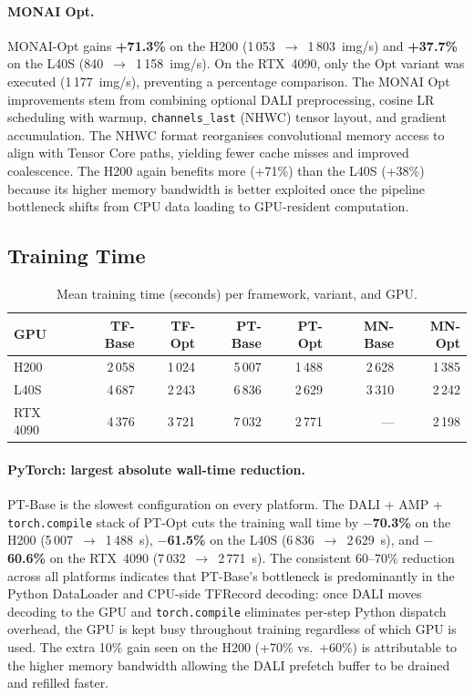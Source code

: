 \paragraph{MONAI Opt.}
MONAI-Opt gains \textbf{+71.3\%} on the H200 (1\,053~$\to$~1\,803~img/s)
and \textbf{+37.7\%} on the L40S (840~$\to$~1\,158~img/s).  On the
RTX~4090, only the Opt variant was executed (1\,177~img/s), preventing
a percentage comparison.  The MONAI Opt improvements stem from combining
optional DALI preprocessing, cosine LR scheduling with warmup,
\texttt{channels\_last} (NHWC) tensor layout, and gradient
accumulation.  The NHWC format reorganises convolutional memory access
to align with Tensor Core paths, yielding fewer cache misses and
improved coalescence.  The H200 again benefits more (+71\%) than the
L40S (+38\%) because its higher memory bandwidth is better exploited
once the pipeline bottleneck shifts from CPU data loading to
GPU-resident computation.

\subsection{Training Time}
\label{subsec:train_time}

\begin{table}[h]
  \centering
  \caption{Mean training time (seconds) per framework, variant, and GPU.}
  \label{tab:train_time_summary}
  \begin{tabular}{lrrrrrr}
    \hline
    \textbf{GPU} & \textbf{TF-Base} & \textbf{TF-Opt} & \textbf{PT-Base} & \textbf{PT-Opt} & \textbf{MN-Base} & \textbf{MN-Opt} \\
    \hline
    H200    & 2\,058 & 1\,024 & 5\,007 & 1\,488 & 2\,628 & 1\,385 \\
    L40S    & 4\,687 & 2\,243 & 6\,836 & 2\,629 & 3\,310 & 2\,242 \\
    RTX 4090 & 4\,376 & 3\,721 & 7\,032 & 2\,771 &   ---  & 2\,198 \\
    \hline
  \end{tabular}
\end{table}

\paragraph{PyTorch: largest absolute wall-time reduction.}
PT-Base is the slowest configuration on every platform.  The DALI +
AMP + \texttt{torch.compile} stack of PT-Opt cuts the training wall
time by \textbf{$-$70.3\%} on the H200 (5\,007~$\to$~1\,488~s),
\textbf{$-$61.5\%} on the L40S (6\,836~$\to$~2\,629~s), and
\textbf{$-$60.6\%} on the RTX~4090 (7\,032~$\to$~2\,771~s).  The
consistent 60--70\% reduction across all platforms indicates that
PT-Base's bottleneck is predominantly in the Python DataLoader and
CPU-side TFRecord decoding: once DALI moves decoding to the GPU and
\texttt{torch.compile} eliminates per-step Python dispatch overhead,
the GPU is kept busy throughout training regardless of which GPU is
used.  The extra 10\% gain seen on the H200 (+70\% vs.\ +60\%) is
attributable to the higher memory bandwidth allowing the DALI prefetch
buffer to be drained and refilled faster.

